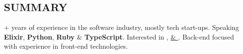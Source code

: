 \subsection*{SUMMARY}

+ years of experience in the software industry, mostly tech start-ups. \newline
\tbullet Speaking \textbf{Elixir}, \textbf{Python}, \textbf{Ruby} \& \textbf{TypeScript}. \newline
\tbullet Interested in \href{https://github.com/ethan605/aws-vpn-client}{},
         \href{https://xkpasswd.ethanify.me}{ \& }. \newline
\tbullet Back-end focused with experience in front-end technologies.
